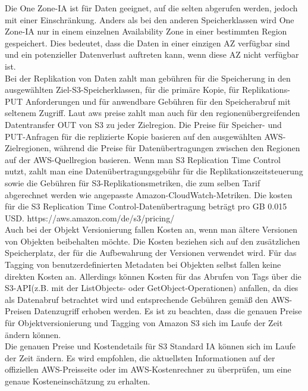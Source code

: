 Die One Zone-IA ist für Daten geeignet, auf die selten abgerufen werden, jedoch mit einer Einschränkung. Anders als bei den anderen Speicherklassen wird One Zone-IA nur in einem einzelnen Availability Zone in einer bestimmten Region gespeichert. Dies bedeutet, dass die Daten in einer einzigen AZ verfügbar sind und ein potenzieller Datenverlust auftreten kann, wenn diese AZ nicht verfügbar ist.\\

Bei der Replikation von Daten zahlt man gebühren für die Speicherung in den ausgewählten Ziel-S3-Speicherklassen, für die primäre Kopie, für Replikations-PUT Anforderungen und für anwendbare Gebühren für den Speicherabruf mit seltenem Zugriff. Laut aws preise zahlt man auch für den regionenübergreifenden Datentransfer OUT von S3 zu jeder Zielregion. Die Preise für Speicher- und PUT-Anfragen für die replizierte Kopie basieren auf den ausgewählten AWS-Zielregionen, während die Preise für Datenübertragungen zwischen den Regionen auf der AWS-Quellregion basieren. Wenn man S3 Replication Time Control nutzt, zahlt man eine Datenübertragungsgebühr für die Replikationszeitsteuerung sowie die Gebühren für S3-Replikationsmetriken, die zum selben Tarif abgerechnet werden wie angepasste Amazon-CloudWatch-Metriken. Die kosten für die S3 Replication Time Control-Datenübertragung beträgt pro GB 0.015 USD. https://aws.amazon.com/de/s3/pricing/ \\


Auch bei der Objekt Versionierung fallen Kosten an, wenn man ältere Versionen von Objekten beibehalten möchte. Die Kosten beziehen sich auf den zusätzlichen Speicherplatz, der für die Aufbewahrung der Versionen verwendet wird. Für das Tagging von benutzerdefinierten Metadaten bei Objekten selbst fallen keine direkten Kosten an. Allerdings können Kosten für das Abrufen von Tags über die S3-API(z.B. mit der ListObjects- oder GetObject-Operationen) anfallen, da dies als Datenabruf betrachtet wird und entsprechende Gebühren gemäß den AWS-Preisen Datenzugriff erhoben werden. Es ist zu beachten, dass die genauen Preise für Objektversionierung und Tagging von Amazon S3 sich im Laufe der Zeit ändern können.\\

Die genauen Preise und Kostendetails für S3 Standard IA können sich im Laufe der Zeit ändern. Es wird empfohlen, die aktuellsten Informationen auf der offiziellen AWS-Preisseite oder im AWS-Kostenrechner zu überprüfen, um eine genaue Kosteneinschätzung zu erhalten.

